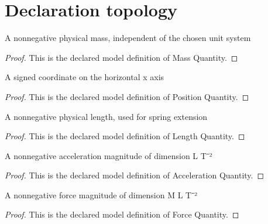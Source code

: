 \section{Declaration topology}
\begin{definition}
  \label{def:physics:phyx-mini-0695:phyxminiproblems-problemphyxmini0695-massquantity}
  A nonnegative physical mass, independent of the chosen unit system
\end{definition}
\begin{proof}
  This is the declared model definition of Mass Quantity.
\end{proof}
\begin{definition}
  \label{def:physics:phyx-mini-0695:phyxminiproblems-problemphyxmini0695-positionquantity}
  A signed coordinate on the horizontal x axis
\end{definition}
\begin{proof}
  This is the declared model definition of Position Quantity.
\end{proof}
\begin{definition}
  \label{def:physics:phyx-mini-0695:phyxminiproblems-problemphyxmini0695-lengthquantity}
  A nonnegative physical length, used for spring extension
\end{definition}
\begin{proof}
  This is the declared model definition of Length Quantity.
\end{proof}
\begin{definition}
  \label{def:physics:phyx-mini-0695:phyxminiproblems-problemphyxmini0695-accelerationquantity}
  A nonnegative acceleration magnitude of dimension L T⁻²
\end{definition}
\begin{proof}
  This is the declared model definition of Acceleration Quantity.
\end{proof}
\begin{definition}
  \label{def:physics:phyx-mini-0695:phyxminiproblems-problemphyxmini0695-forcequantity}
  A nonnegative force magnitude of dimension M L T⁻²
\end{definition}
\begin{proof}
  This is the declared model definition of Force Quantity.
\end{proof}
